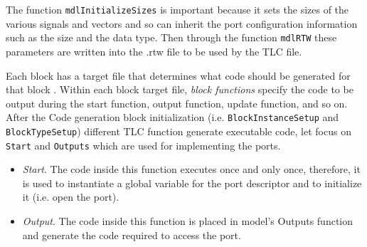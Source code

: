 The function \verb|mdlInitializeSizes| is important because it sets the sizes of the various signals and vectors and so can inherit the port configuration information such as the size and the data type. Then through the function \verb|mdlRTW| these parameters are written into the .rtw file to be used by the TLC file.
\par Each block has a target file that determines what code should be generated for that block \cite{BlockTLC}. Within each block target file, \emph{block functions} specify the code to be output during the start function, output function, update function, and so on. After the Code generation block initialization (i.e. \verb|BlockInstanceSetup| and \verb|BlockTypeSetup|) different TLC function generate executable code, let focus on \verb|Start| and \verb|Outputs| which are used for implementing the ports. 
\begin{itemize}
\item \emph{Start}. The code inside this function executes once and only once, therefore, it is used to instantiate a global variable for the port descriptor and to initialize it (i.e. open the port).
\item \emph{Output}. The code inside this function is placed in model's Outputs function and generate the code required to access the port.
\end{itemize}

